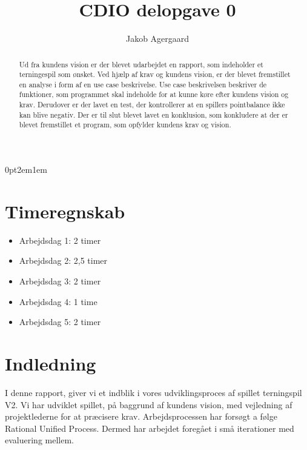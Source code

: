 \documentclass{article}
\title{CDIO delopgave 0}
\author{Jakob Agergaard}
\begin{document}
\titlespacing{\section}
    {0pt}{2em}{1em}



\normalsize
\begin{abstract}

Ud fra kundens vision er der blevet udarbejdet en rapport, som indeholder et terningespil  som ønsket. Ved hjælp af krav og kundens vision, er der blevet fremstillet en analyse i form af en use case beskrivelse. Use case beskrivelsen beskriver de funktioner, som programmet skal indeholde for at kunne køre efter kundens vision og krav. Derudover er der lavet en test, der kontrollerer at en spillers pointbalance ikke kan blive negativ. Der er til slut blevet lavet en konklusion, som konkludere at der er blevet fremstillet et program, som opfylder kundens krav og vision.
\end{abstract}
\break

\tableofcontents

\break

\section{Timeregnskab}
\begin {itemize}
\item Arbejdsdag 1: 2 timer
\item Arbejdsdag 2: 2,5 timer 
\item Arbejdsdag 3: 2 timer 
\item Arbejdsdag 4: 1 time
\item Arbejdsdag 5: 2 timer
\end {itemize}

\section{Indledning}

I denne rapport, giver vi et indblik i vores udviklingsproces af spillet terningspil V2.  Vi har udviklet spillet, på baggrund af kundens vision, med vejledning af projektlederne for at præcisere krav. Arbejdsprocessen har forsøgt a følge Rational Unified Process. Dermed har arbejdet foregået i små iterationer med evaluering mellem. 
\end{document}
